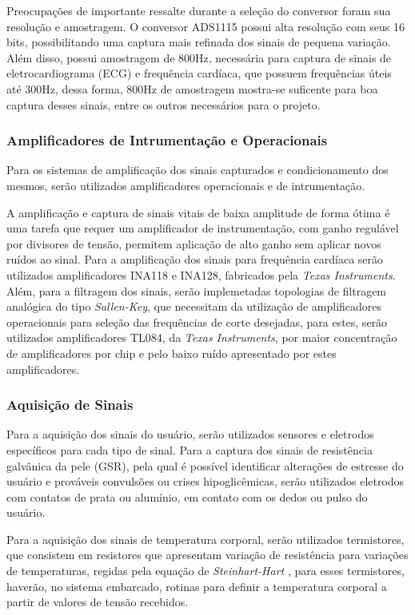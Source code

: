 Preocupações de importante ressalte durante a seleção do 
conversor 
foram sua resolução e amostragem. O conversor ADS1115 possui alta 
resolução com 
seus 16 bits, possibilitando uma captura mais refinada dos sinais 
de pequena 
variação. Além disso, possui amostragem de 800Hz, necessária 
para captura 
de sinais de eletrocardiograma (ECG) e frequência cardíaca, 
que possuem 
frequências úteis até 300Hz, dessa forma, 800Hz de amostragem 
mostra-se 
suficente para boa captura desses sinais, entre os outros necessários para o projeto.

\subsubsection{Amplificadores de Intrumentação e Operacionais}
Para os sistemas de amplificação dos sinais capturados e condicionamento dos mesmos, serão utilizados amplificadores operacionais e de intrumentação.

A amplificação e captura de sinais vitais de baixa amplitude de forma ótima é 
uma tarefa que requer um amplificador de instrumentação, com ganho regulável 
por divisores de tensão, permitem aplicação de alto ganho sem aplicar novos 
ruídos ao sinal. Para a amplificação dos sinais para frequência cardíaca 
serão utilizados amplificadores INA118 e INA128, fabricados pela \textit{Texas Instruments}. Além, para a filtragem dos sinais, serão implemetadas 
topologias de filtragem analógica do tipo \textit{Sallen-Key}, que necessitam da 
utilização de amplificadores operacionais para seleção das frequências 
de corte desejadas, para estes, serão utilizados amplificadores TL084, 
da \textit{Texas Instruments}, por maior concentração de amplificadores 
por chip e pelo baixo ruído apresentado por estes amplificadores.

\subsubsection{Aquisição de Sinais}
Para a aquisição dos sinais do usuário, serão utilizados sensores e eletrodos específicos para cada tipo de sinal. Para a captura dos sinais de resistência galvânica da pele (GSR), pela qual é possível identificar alterações de estresse do usuário e prováveis convulsões ou crises hipoglicêmicas, serão utilizados eletrodos com contatos de prata ou alumínio, em contato com os dedos ou pulso do usuário.

Para a aquisição dos sinais de temperatura corporal, serão utilizados termistores, que consistem em resistores que apresentam variação de resistência para variações de temperaturas, regidas pela equação de \textit{Steinhart-Hart} \cite{gregg}, para esses termistores, haverão, no sistema embarcado, rotinas para definir a temperatura corporal a partir de valores de tensão recebidos.


